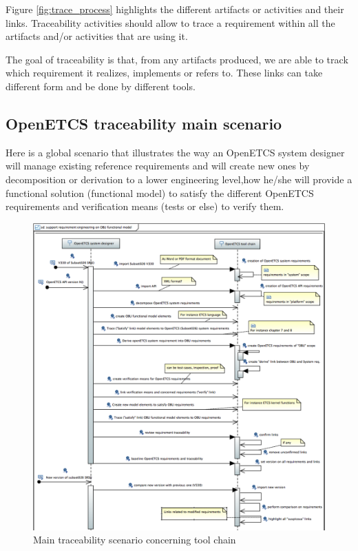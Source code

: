\documentclass[11pt]{template/openetcs_report}
\begin{document}
Figure  \ref{fig:trace_process} highlights the different artifacts or activities and their
links. Traceability activities should allow to trace a requirement within all
the artifacts and/or activities that are using it.

The goal of traceability is that, from any artifacts produced, we are able to
track which requirement it realizes, implements  or refers to. These links can
take different form and be done by different tools. 

\subsection{OpenETCS traceability main scenario}
\label{sec-2-2-2}

Here is a global scenario that illustrates the way an OpenETCS system designer will manage existing reference requirements and will create new ones by decomposition or derivation to a lower engineering level,how he/she will provide a functional solution (functional model) to satisfy the different OpenETCS requirements and verification means (tests or else) to verify them.
\begin{figure}[htb]
\centering
\includegraphics[width=1.0\linewidth]{./images/ToolChainTraceabilityMainScenario.png}
\caption{\label{fig:toolChainTraceabilityMainScenario}Main traceability scenario concerning tool chain }
\end{figure}
\end{document}
